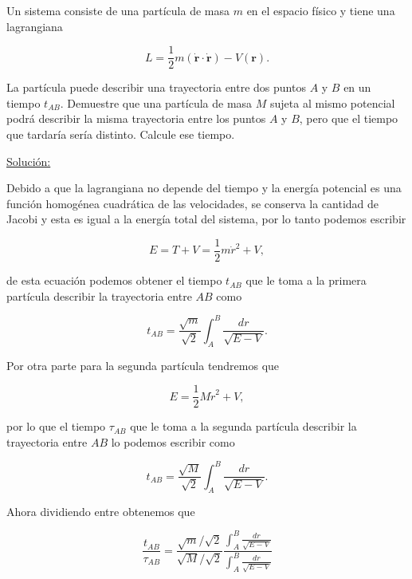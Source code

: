 \documentclass[a4paper,10pt]{article}
\numberwithin{equation}{section}
\begin{document}
Un sistema consiste de una partícula de masa $m$ en el espacio físico y tiene una 
lagrangiana

$$
L = \frac{1}{2}m(\mathbf{\dot{r}} \cdot \mathbf{\dot{r}}) - V(\mathbf{r}).
$$

La partícula puede describir una trayectoria entre dos puntos $A$ y $B$ en un tiempo 
$t_{AB}$. Demuestre que una partícula de masa $M$ sujeta al mismo potencial podrá 
describir la misma trayectoria entre los puntos $A$ y $B$, pero que el tiempo que 
tardaría sería distinto. Calcule ese tiempo.

\vspace{.3cm}

\underline{Solución:} \vspace{.3cm}

Debido a que la lagrangiana no depende del tiempo y la energía potencial 
es una función homogénea cuadrática de las velocidades, se conserva la cantidad 
de Jacobi y esta es igual a la energía total del sistema, por lo tanto 
podemos escribir

\begin{equation}
 E = T + V = \frac{1}{2}m\dot{r}^2 + V,
\end{equation}

de esta ecuación podemos obtener el tiempo $t_{AB}$ que le toma a la primera 
partícula describir la trayectoria entre $AB$ como

\begin{equation}
 t_{AB} = \frac{\sqrt{m}}{\sqrt{2}} \int_A^B \frac{dr}{\sqrt{E - V}}.
 \label{eq:tiempo1}
\end{equation}

Por otra parte para la segunda partícula tendremos que

\begin{equation}
 E = \frac{1}{2}M\dot{r}^2 + V,
\end{equation}

por lo que el tiempo $\tau_{AB}$ que le toma a la segunda 
partícula describir la trayectoria entre $AB$ lo podemos escribir como

\begin{equation}
 t_{AB} = \frac{\sqrt{M}}{\sqrt{2}} \int_A^B \frac{dr}{\sqrt{E - V}}.
 \label{eq:tiempo2}
\end{equation}

Ahora dividiendo  entre  obtenemos que 

\begin{equation}
 \frac{t_{AB}}{\tau_{AB}} = \frac{\sqrt{m}/\sqrt{2}}{\sqrt{M}/\sqrt{2}} 
 \frac{\int_A^B \frac{dr}{\sqrt{E - V}}}{\int_A^B \frac{dr}{\sqrt{E - V}}}
\end{equation}
\end{document}
